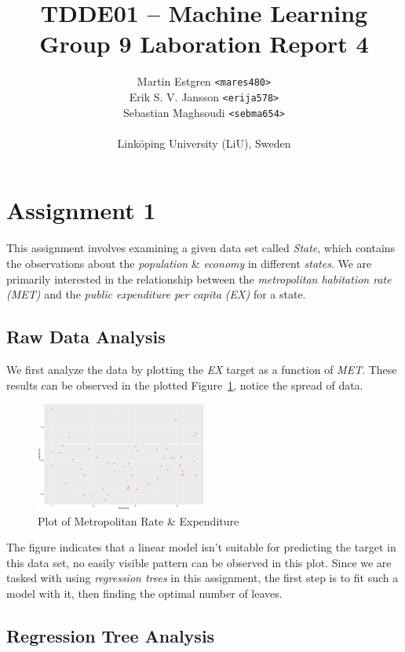 \documentclass[a4paper, twocolumn]{article}
\title{TDDE01 -- Machine Learning \\
       Group 9 Laboration Report 4}
\author{{Martin Estgren \texttt{<mares480>}} \\
        {Erik S. V. Jansson \texttt{<erija578>}} \\
        {Sebastian Maghsoudi \texttt{<sebma654>}} \\~\\
        {Linköping University (LiU), Sweden}}
\begin{document}
    \maketitle %

    \section*{Assignment 1}

        This assignment involves examining a given data set called \emph{State}, which contains the observations about the \emph{population} \& \emph{economy} in different \emph{states}. We are primarily interested in the relationship between the \emph{metropolitan habitation rate (MET)} and the \emph{public expenditure per capita (EX)} for a state.

    \subsection*{Raw Data Analysis}

        We first analyze the data by plotting the \emph{EX} target as a function of \emph{MET}. These results can be observed in the plotted Figure~\ref{fig:state}, notice the spread of data.

        \begin{figure}[h!]
            \centering
            \caption{Plot of Metropolitan Rate \& Expenditure}
            \label{fig:state}
            \includegraphics[width=0.5\textwidth]{share/A1_data.eps}
        \end{figure}

        The figure indicates that a linear model isn't suitable for predicting the target in this data set, no easily visible pattern can be observed in this plot. Since we are tasked with using \emph{regression trees} in this assignment, the first step is to fit such a model with it, then finding the optimal number of leaves.

    \subsection*{Regression Tree Analysis}
\end{document}
